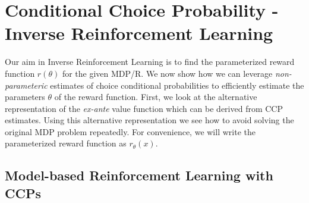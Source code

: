 \documentclass{article}
\begin{document}
\section{Conditional Choice Probability - Inverse Reinforcement Learning}

Our aim in Inverse Reinforcement Learning is to find the parameterized reward function $r(\theta)$ for the given MDP/R. We now show how we can leverage \textit{non-parameteric} estimates of choice conditional probabilities to efficiently estimate the parameters $\theta$ of the reward function.  
First, we look at the alternative representation of the \emph{ex-ante} value function which can be derived from CCP estimates. Using this alternative representation we see how to avoid solving the original MDP problem repeatedly.
For convenience, we will write the parameterized reward function as $r_{\theta}(x)$.

\subsection{Model-based Reinforcement Learning with CCPs}
\end{document}
